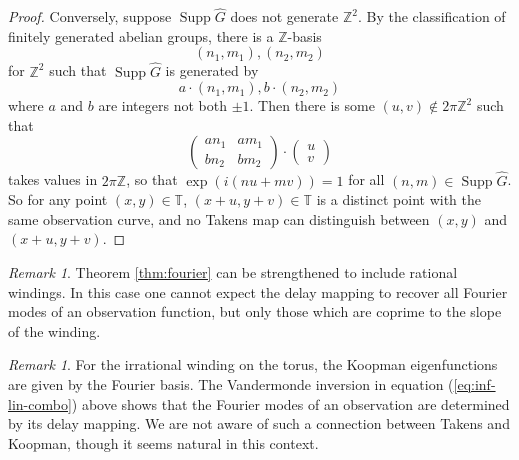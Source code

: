 \documentclass[11pt]{article}
\theoremstyle{definition}
\theoremstyle{remark}
\newtheorem{remark}[theorem]{Remark}
\newcommand{\ZZ}{\mathbb{Z}}
\newcommand{\TT}{\mathbb{T}}
\DeclareMathOperator{\Supp}{Supp}
\begin{document}
\begin{proof}
    Conversely, suppose $\Supp\hat{G}$ does not generate $\ZZ^2$. By the classification of finitely generated abelian groups, there is a $\ZZ$-basis
    \[(n_1,m_1), (n_2, m_2)\]
    for $\ZZ^2$ such that $\Supp\hat{G}$ is generated by
    \[a\cdot (n_1, m_1), b\cdot(n_2,m_2)\]
    where $a$ and $b$ are integers not both $\pm 1$. Then there is some $(u,v) \notin 2\pi\ZZ^2$ such that
    \[\begin{pmatrix}an_1 & am_1 \\bn_2 & bm_2\end{pmatrix}\cdot \begin{pmatrix}u \\ v\end{pmatrix}\]
    takes values in $2\pi\ZZ$, so that $\exp(i(nu+mv)) = 1$ for all $(n,m) \in \Supp\hat{G}$. So for any point $(x,y)\in \TT$, $(x+u,y+v)\in \TT$ is a distinct point with the same observation curve, and no Takens map can distinguish between $(x,y)$ and $(x+u, y+v)$.
    \end{proof}
    
    \begin{remark}
        Theorem \ref{thm:fourier} can be strengthened to include rational windings. In this case one cannot expect the delay mapping to recover all Fourier modes of an observation function, but only those which are coprime to the slope of the winding.
    \end{remark}

    \begin{remark}
        For the irrational winding on the torus, the Koopman eigenfunctions are given by the Fourier basis. The Vandermonde inversion in equation (\ref{eq:inf-lin-combo}) above shows that the Fourier modes of an observation are determined by its delay mapping.  We are not aware of such a connection between Takens and Koopman, though it seems natural in this context.
    \end{remark}
\end{document}
